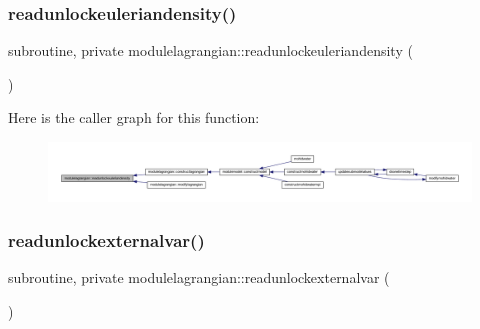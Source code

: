\subsubsection{\texorpdfstring{readunlockeuleriandensity()}{readunlockeuleriandensity()}}
{\footnotesize\ttfamily subroutine, private modulelagrangian\+::readunlockeuleriandensity (\begin{DoxyParamCaption}{ }\end{DoxyParamCaption})\hspace{0.3cm}{\ttfamily [private]}}

Here is the caller graph for this function\+:\nopagebreak
\begin{figure}[H]
\begin{center}
\leavevmode
\includegraphics[width=350pt]{namespacemodulelagrangian_a62c1768ee36cf2fc50c44c595fbf0408_icgraph}
\end{center}
\end{figure}
\mbox{\label{namespacemodulelagrangian_afc1c234aa5939835cbe1bc80abe16766}} 
\subsubsection{\texorpdfstring{readunlockexternalvar()}{readunlockexternalvar()}}
{\footnotesize\ttfamily subroutine, private modulelagrangian\+::readunlockexternalvar (\begin{DoxyParamCaption}{ }\end{DoxyParamCaption})\hspace{0.3cm}{\ttfamily [private]}}

